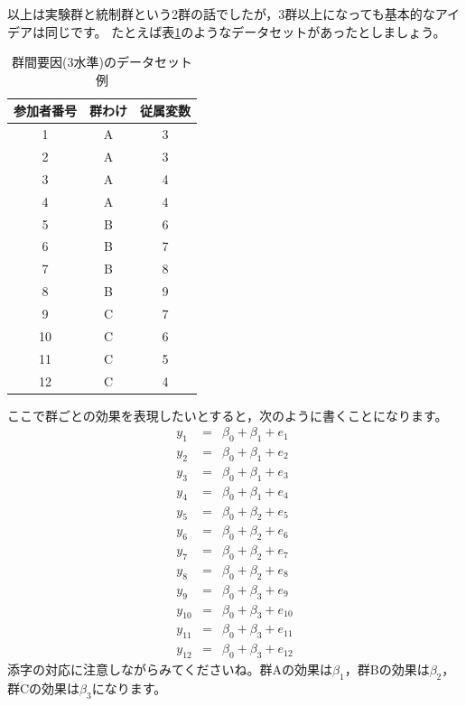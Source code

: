 \documentclass{ltjsbook}
\begin{document}
以上は実験群と統制群という2群の話でしたが，3群以上になっても基本的なアイデアは同じです。
たとえば表\ref{tbl::07_01}のようなデータセットがあったとしましょう。
\begin{table}[ht]
	\centering
	\caption{群間要因(3水準)のデータセット例}
	\begin{tabular}{ccc}
		参加者番号 & 群わけ & 従属変数 \\\hline
		1     & A   & 3    \\
		2     & A   & 3    \\
		3     & A   & 4    \\
		4     & A   & 4    \\
		5     & B   & 6    \\
		6     & B   & 7    \\
		7     & B   & 8    \\
		8     & B   & 9    \\
		9     & C   & 7    \\
		10    & C   & 6    \\
		11    & C   & 5    \\
		12    & C   & 4    \\\hline
	\end{tabular}
	\label{tbl::07_01}
\end{table}

ここで群ごとの効果を表現したいとすると，次のように書くことになります。
\begin{eqnarray*}
	y_1 &=& \beta_0 + \beta_1 + e_1 \\
	y_2 &=& \beta_0 + \beta_1 + e_2 \\
	y_3 &=& \beta_0 + \beta_1 + e_3 \\
	y_4 &=& \beta_0 + \beta_1 + e_4 \\
	y_5 &=& \beta_0 + \beta_2 + e_5 \\
	y_6 &=& \beta_0 + \beta_2 + e_6 \\
	y_7 &=& \beta_0 + \beta_2 + e_7 \\
	y_8 &=& \beta_0 + \beta_2 + e_8 \\
	y_9 &=& \beta_0 + \beta_3 + e_9 \\
	y_{10} &=& \beta_0 + \beta_3 + e_{10} \\
	y_{11} &=& \beta_0 + \beta_3 + e_{11} \\
	y_{12} &=& \beta_0 + \beta_3 + e_{12}
\end{eqnarray*}
添字の対応に注意しながらみてくださいね。群Aの効果は$\beta_1$，群Bの効果は$\beta_2$，群Cの効果は$\beta_3$になります。
\end{document}
